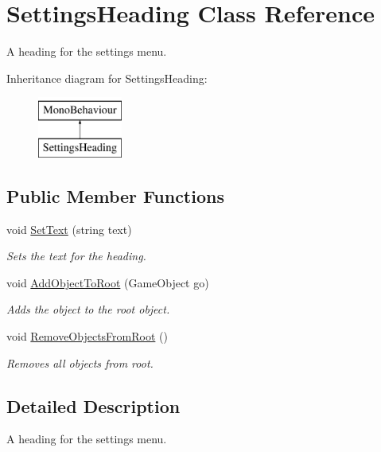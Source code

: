 \hypertarget{class_settings_heading}{}\section{Settings\+Heading Class Reference}
\label{class_settings_heading}


A heading for the settings menu.  


Inheritance diagram for Settings\+Heading\+:\begin{figure}[H]
\begin{center}
\leavevmode
\includegraphics[height=2.000000cm]{class_settings_heading}
\end{center}
\end{figure}
\subsection*{Public Member Functions}
\begin{DoxyCompactItemize}
\item 
void \hyperlink{class_settings_heading_aaba3e6d88ae10b0f6b2cd4191283a01e}{Set\+Text} (string text)
\begin{DoxyCompactList}\small\item\em Sets the text for the heading. \end{DoxyCompactList}\item 
void \hyperlink{class_settings_heading_a73c23fac39e8ed344a3e7800d206a3e9}{Add\+Object\+To\+Root} (Game\+Object go)
\begin{DoxyCompactList}\small\item\em Adds the object to the root object. \end{DoxyCompactList}\item 
void \hyperlink{class_settings_heading_a08afcc6d87250ccfd02fdafc61e4f683}{Remove\+Objects\+From\+Root} ()
\begin{DoxyCompactList}\small\item\em Removes all objects from root. \end{DoxyCompactList}\end{DoxyCompactItemize}


\subsection{Detailed Description}
A heading for the settings menu. 



